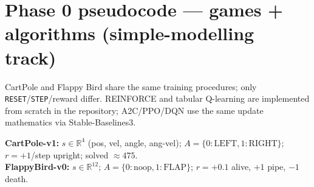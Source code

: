 \documentclass[9pt,a4paper]{article}
\begin{document}
\pagestyle{empty}

\section*{Phase 0 pseudocode --- games + algorithms (simple-modelling track)}
\small
CartPole and Flappy Bird share the same training procedures; only
\texttt{RESET}/\texttt{STEP}/reward differ. REINFORCE and tabular Q-learning
are implemented from scratch in the repository; A2C/PPO/DQN use the same
update mathematics via Stable-Baselines3.

\vspace{0.4em}
\noindent\textbf{CartPole-v1:}
$s\in\mathbb{R}^4$ (pos, vel, angle, ang-vel);
$A=\{0{:}\mathrm{LEFT},1{:}\mathrm{RIGHT}\}$;
$r=+1$/step upright; solved $\approx 475$.\\
\noindent\textbf{FlappyBird-v0:}
$s\in\mathbb{R}^{12}$;
$A=\{0{:}\mathrm{noop},1{:}\mathrm{FLAP}\}$;
$r=+0.1$ alive, $+1$ pipe, $-1$ death.

\renewcommand{\thealgocf}{P0.1}
\begin{algorithm}[H]
\caption{REINFORCE (Monte Carlo policy gradient) --- coded from scratch}
\end{algorithm}

\renewcommand{\thealgocf}{P0.2}
\begin{algorithm}[H]
\caption{Tabular Q-learning on \emph{discretized} CartPole}
\end{algorithm}
\end{document}
